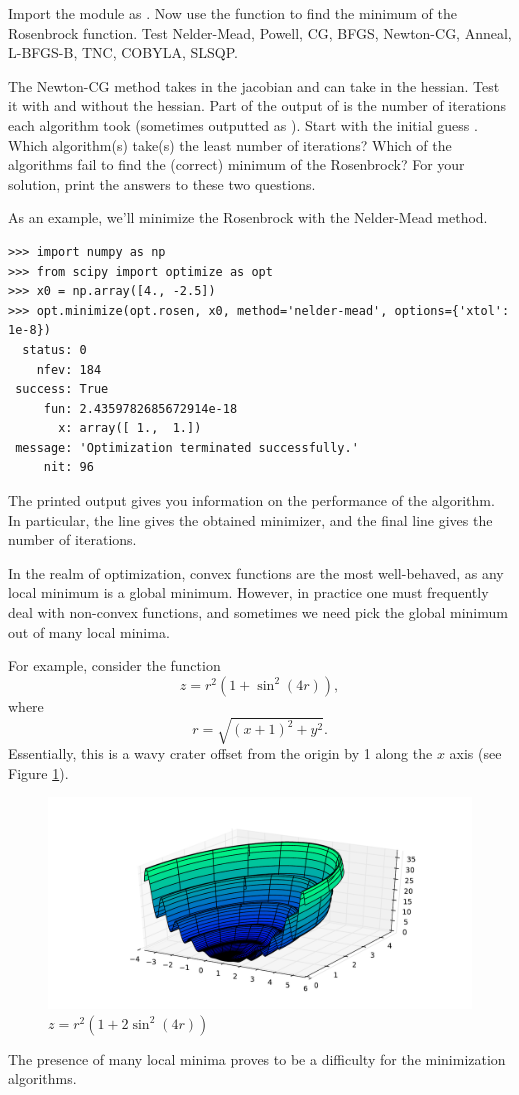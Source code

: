 \begin{problem}
Import the  module as . Now use the  function to find the minimum of the Rosenbrock function.
Test Nelder-Mead, Powell, CG, BFGS, Newton-CG, Anneal, L-BFGS-B, TNC, COBYLA, SLSQP.

The Newton-CG method takes in the jacobian and can take in the hessian. Test it with and without the hessian.
Part of the output of  is the number of iterations each algorithm took (sometimes outputted as ).
Start with the initial guess .
Which algorithm(s) take(s) the least number of iterations?
Which of the algorithms fail to find the (correct) minimum of the Rosenbrock?
For your solution, print the answers to these two questions.

As an example, we'll minimize the Rosenbrock with the Nelder-Mead method.
\begin{lstlisting}
>>> import numpy as np
>>> from scipy import optimize as opt
>>> x0 = np.array([4., -2.5])
>>> opt.minimize(opt.rosen, x0, method='nelder-mead', options={'xtol': 1e-8})
  status: 0
    nfev: 184
 success: True
     fun: 2.4359782685672914e-18
       x: array([ 1.,  1.])
 message: 'Optimization terminated successfully.'
     nit: 96
\end{lstlisting}
The printed output gives you information on the performance of the algorithm. In particular, the line  gives the obtained minimizer, and the final
line  gives the number of iterations.
\end{problem}

In the realm of optimization, convex functions are the most well-behaved, as any local minimum is a global minimum.
However, in practice one must frequently deal with non-convex functions, and sometimes we need pick the global minimum out of many local minima.

For example, consider the function
\[
z = r^2 (1+ \sin^2(4r)),
\]
where
\[
r = \sqrt{(x+1)^2 + y^2}.
\]
Essentially, this is a wavy crater offset from the origin by 1 along the $x$ axis (see Figure \ref{opt:multimin}).
\begin{figure}
\includegraphics[width=\textwidth]{ManyMinima.pdf}
\caption{$z = r^2 (1+ 2\sin^2(4r))$}
\label{opt:multimin}
\end{figure}
The presence of many local minima proves to be a difficulty for the minimization algorithms.

